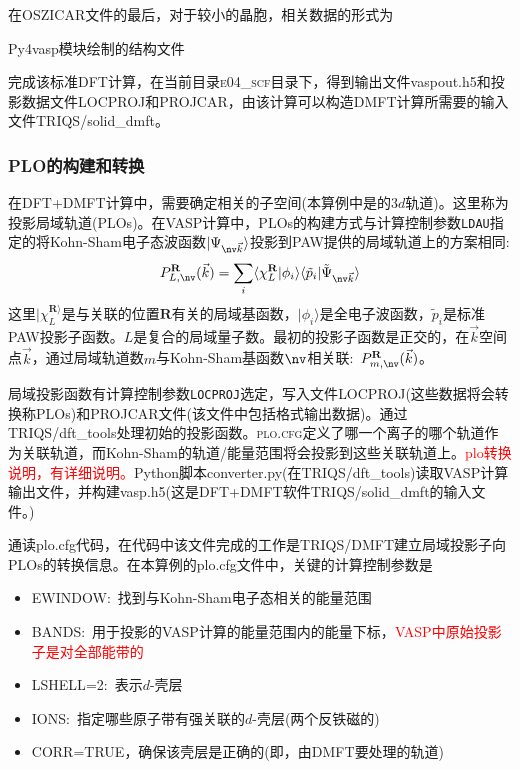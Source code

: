 在\textrm{OSZICAR}文件的最后，对于较小的晶胞，相关数据的形式为

\textrm{Py4vasp}模块绘制的结构文件

完成该标准\textrm{DFT}计算，在当前目录\textsc{e04\_scf}目录下，得到输出文件\textrm{vaspout.h5}和投影数据文件\textrm{LOCPROJ}和\textrm{PROJCAR}，由该计算可以构造\textrm{DMFT}计算所需要的输入文件\textrm{TRIQS/solid\_dmft}。

\subsubsection{\rm{PLO}的构建和转换}
在\textrm{DFT+DMFT}计算中，需要确定相关的子空间(本算例中是的$3d$轨道)。这里称为投影局域轨道\textrm{(PLOs)}。在\textrm{VASP}计算中，\textrm{PLOs}的构建方式与计算控制参数\texttt{LDAU}指定的将\textrm{Kohn-Sham}电子态波函数$|\Psi_{\nv\vec k}\rangle$投影到\textrm{PAW}提供的局域轨道上的方案相同:
\begin{displaymath}
	P_{L,\nv}^{\mathbf{R}}(\vec k)=\sum_i\langle\chi_L^{\mathbf{R}}|\phi_i\rangle\langle\tilde p_i|\tilde{\Psi}_{\nv\vec k}\rangle
\end{displaymath}
这里$|\chi_L^{\mathbf{R}\rangle}$是与关联的位置$\mathbf{R}$有关的局域基函数，$|\phi_i\rangle$是全电子波函数，$\tilde p_i$是标准\textrm{PAW}投影子函数。$L$是复合的局域量子数。最初的投影子函数是正交的，在$\vec k$空间点$\vec k$，通过局域轨道数$m$与\textrm{Kohn-Sham}基函数$\nv$相关联:~$P_{m,\nv}^{\mathbf{R}}(\vec k)$。

局域投影函数有计算控制参数\texttt{LOCPROJ}选定，写入文件\textrm{LOCPROJ}(这些数据将会转换称\textrm{PLOs})和\textrm{PROJCAR}文件(该文件中包括格式输出数据)。通过\textrm{TRIQS/dft\_tools}处理初始的投影函数。\textsc{plo.cfg}定义了哪一个离子的哪个轨道作为关联轨道，而\textrm{Kohn-Sham}的轨道/能量范围将会投影到这些关联轨道上。\textcolor{red}{\textrm{plo}转换说明，有详细说明。}\textrm{Python}脚本\textrm{converter.py}(在\textrm{TRIQS/dft\_tools})读取\textrm{VASP}计算输出文件，并构建\textrm{vasp.h5}(这是\textrm{DFT+DMFT}软件\textrm{TRIQS/solid\_dmft}的输入文件。)

通读\textrm{plo.cfg}代码，在代码中该文件完成的工作是\textrm{TRIQS/DMFT}建立局域投影子向\textrm{PLOs}的转换信息。在本算例的\textrm{plo.cfg}文件中，关键的计算控制参数是
\begin{itemize}
	\item \textsc{EWINDOW}:~找到与\textrm{Kohn-Sham}电子态相关的能量范围
	\item \textsc{BANDS}:~用于投影的\textrm{VASP}计算的能量范围内的能量下标，\textcolor{red}{\textrm{VASP}中原始投影子是对全部能带的}
	\item \textsc{LSHELL}=2:~表示$d$-壳层
	\item \textsc{IONS}:~指定哪些原子带有强关联的$d$-壳层(两个反铁磁的)
	\item \textsc{CORR}=\textrm{TRUE}，确保该壳层是正确的(即，由\textrm{DMFT}要处理的轨道)
\end{itemize}

